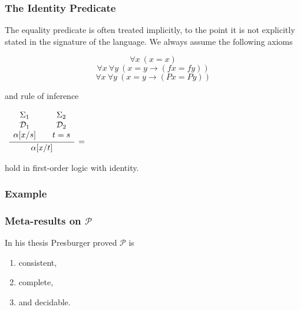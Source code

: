 \documentclass{beamer}
\begin{document}
\begin{frame}
	\frametitle{The Identity Predicate}
	
	The equality predicate is often treated implicitly, to the point it is not explicitly stated in the signature of the language. We always assume the following axioms 
	
	$$\forall x \ (x = x) $$ $$ \forall x \ \forall y \ (x = y \rightarrow (fx = fy)) $$ $$ \forall x \ \forall y \ (x = y \rightarrow (Px = Py))$$
	
	and rule of inference
	
		\begin{center}
		$\begin{array}{ c }
		
		\infer[=]{\alpha[x/t]}
		{
			\begin{array}{c} \Sigma_{1}  \\ \mathcal{D}_{1} \\ \alpha[x/s] \end{array}
			& 
			\begin{array}{c} \Sigma_{2}  \\ \mathcal{D}_{2} \\ t = s 
		 \end{array}
		}	
		
	\end{array}$
	\end{center}
	
	hold in first-order logic with identity. 
	
\end{frame}

\begin{frame}
	\frametitle{Example}
	
	
\end{frame}

\begin{frame}
	\frametitle{Meta-results on $\mathcal{P}$}
	
	In his thesis Presburger proved $\mathcal{P}$ is
	
	\begin{enumerate}
		\item consistent,
		\item complete, 
		\item and decidable.
	\end{enumerate}
	
	\vspace{5cm}
	
	
	
\end{frame}
\end{document}
